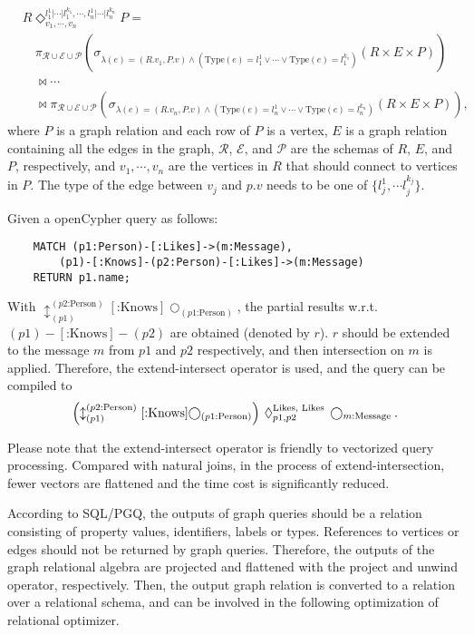 \begin{equation}
    \begin{split}
        & R \Diamond^{l_1^{1}|\cdots|l_1^{k_1}, \cdots, l_n^{1}|\cdots|l_n^{k_n}}_{v_1, \cdots, v_n} P = \\ 
        & \hspace{1em} \pi_{\mathcal{R} \cup \mathcal{E} \cup \mathcal{P}}(\sigma_{\lambda(e) = (R.v_1, P.v) \land (\text{Type}(e) = l_1^1 \lor \cdots \lor \text{Type}(e) = l_1^{k_1})}(R \times E \times P)) \\
        & \hspace{1em} \Join \cdots \\
        & \hspace{1em} \Join \pi_{\mathcal{R} \cup \mathcal{E} \cup \mathcal{P}}(\sigma_{\lambda(e) = (R.v_n, P.v) \land (\text{Type}(e) = l_n^1 \lor \cdots \lor \text{Type}(e) = l_n^{k_n})}(R \times E \times P)),
    \end{split}
\end{equation}
where $P$ is a graph relation and each row of $P$ is a vertex,
$E$ is a graph relation containing all the edges in the graph, 
$\mathcal{R}$, $\mathcal{E}$, and $\mathcal{P}$ are the schemas of $R$, $E$, and $P$, respectively,
and $v_1, \cdots, v_n$ are the vertices in $R$ that should connect to vertices in $P$.
The type of the edge between $v_j$ and $p.v$ needs to be one of $\{l_j^1, \cdots l_j^{k_j}\}$.

Given a openCypher query as follows:
\begin{lstlisting}
    MATCH (p1:Person)-[:Likes]->(m:Message),
        (p1)-[:Knows]-(p2:Person)-[:Likes]->(m:Message)
    RETURN p1.name;
\end{lstlisting}
With $\updownarrow^{(p2\text{:Person})}_{(p1)}[\text{:Knows}]\bigcirc_{(p1\text{:Person})}$, the partial results w.r.t.~$(p1)-[\text{:Knows}]-(p2)$ are obtained (denoted by $r$). 
$r$ should be extended to the message $m$ from $p1$ and $p2$ respectively, and then intersection on $m$ is applied.
Therefore, the extend-intersect operator is used, and the query can be compiled to
\begin{equation}
    \left(\updownarrow^{(p2\text{:Person})}_{(p1)}[\text{:Knows}]\bigcirc_{(p1\text{:Person})}\right) \hspace{0.2em} \Diamond_{p1, p2}^{\text{Likes, Likes}} \hspace{0.2em} \bigcirc_{m\text{:Message}}.
\end{equation}


Please note that the extend-intersect operator is friendly to vectorized query processing.
Compared with natural joins, in the process of extend-intersection, fewer vectors are flattened and the time cost is significantly reduced.

According to SQL/PGQ, the outputs of graph queries should be a relation consisting of property values, identifiers, labels or types.
References to vertices or edges should not be returned by graph queries.
Therefore, the outputs of the graph relational algebra are projected and flattened with the project and unwind operator, respectively.
Then, the output graph relation is converted to a relation over a relational schema, and can be involved in the following optimization of relational optimizer.


